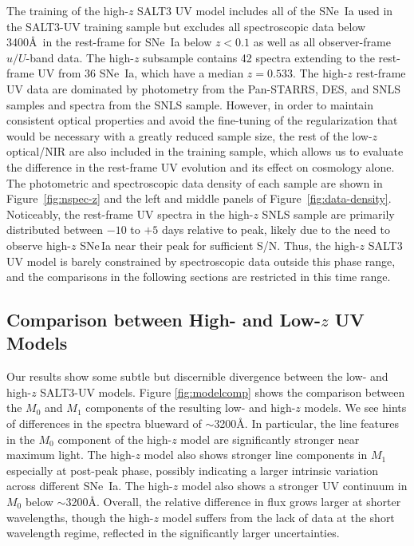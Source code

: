 \documentclass[twocolumn,tighten,times,floatfix]{aastex631}
\begin{document}
The training of the high-$z$ SALT3 UV model includes all of the SNe~Ia used in the SALT3-UV training sample but excludes all spectroscopic data below 3400\AA\ in the rest-frame for SNe~Ia below $z<0.1$ as well as all observer-frame $u/U$-band data. 
The high-$z$ subsample contains 42 spectra extending to the rest-frame UV from 36 SNe~Ia, which have a median $z = 0.533$. The high-$z$ rest-frame UV data are dominated by photometry from the Pan-STARRS, DES, and SNLS samples and spectra from the SNLS sample.  However,
in order to maintain consistent optical properties and avoid the fine-tuning of the regularization that would be necessary with a greatly reduced sample size, the rest of the low-$z$ optical/NIR are also included in the training sample, which allows us to evaluate the difference in the rest-frame UV evolution and its effect on cosmology alone.
 The photometric and spectroscopic data density of each sample are shown in Figure~\ref{fig:nspec-z} and the left and middle panels of Figure~\ref{fig:data-density}. 
Noticeably, the rest-frame UV spectra in the high-$z$ SNLS sample are primarily distributed between $-10$ to $+5$ days relative to peak, likely due to the need to observe high-$z$ SNe\,Ia near their peak for sufficient S/N.
Thus, the high-$z$ SALT3 UV model is barely constrained by spectroscopic data outside this phase range, and the comparisons in the following sections are restricted in this time range.


\subsection{Comparison between High- and Low-$z$ UV Models }\label{sec:zcomp}

Our results show some subtle but discernible divergence between the low- and high-$z$ SALT3-UV models.
Figure \ref{fig:modelcomp} shows the comparison between the $M_0$ and $M_1$ components of the resulting low- and high-$z$ models. We see hints of differences in the spectra blueward of $\sim$3200\AA. In particular, the line features in the $M_0$ component of the high-$z$ model are significantly stronger near maximum light. The high-$z$ model also shows stronger line components in $M_1$ especially at post-peak phase, possibly indicating a larger intrinsic variation across different SNe~Ia. 
The high-$z$ model also shows a stronger UV continuum in $M_0$ below $\sim$3200\AA. Overall, the relative difference in flux grows larger at shorter wavelengths, though the high-$z$ model suffers from the lack of data at the short wavelength regime, reflected in the significantly larger uncertainties. 
\end{document}
